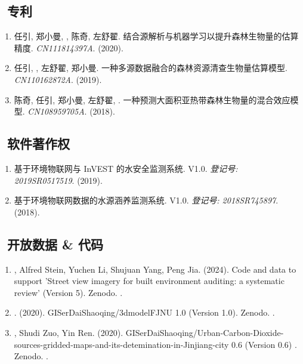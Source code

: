 \subsection*{\texorpdfstring{\faBook\ 专利}{专利}}
\begin{enumerate}
\item
     任引, 郑小曼, {}, 陈奇, 左舒翟.
     结合源解析与机器学习以提升森林生物量的估算精度.
     \textit{CN111814397A}. (2020).
\item
     任引, {}, 左舒翟, 郑小曼.
     一种多源数据融合的森林资源清查生物量估算模型.
     \textit{CN110162872A}. (2019).
\item
     陈奇, 任引, 郑小曼, 左舒翟, {}.
     一种预测大面积亚热带森林生物量的混合效应模型.
     \textit{CN108959705A}. (2018).
\end{enumerate}

\subsection*{\texorpdfstring{\faBook\ 软件著作权}{软件著作权}}
\begin{enumerate}
\item
   基于环境物联网与 InVEST 的水安全监测系统. V1.0.
    \textit{登记号: 2019SR0517519}. (2019).
\item
    基于环境物联网数据的水源涵养监测系统. V1.0.
    \textit{登记号: 2018SR745897}. (2018).
\end{enumerate}

\subsection*{\texorpdfstring{\faBook\ 开放数据 \& 代码}{开放数据 \& 代码}}
\begin{enumerate}
\item
   \Shaoqing, Alfred Stein, Yuchen Li, Shujuan Yang, Peng Jia. (2024).
    Code and data to support 'Street view imagery for built environment auditing: a systematic review'  (Version 5). Zenodo. 
    .
\item
   \Shaoqing. (2020).
    GISerDaiShaoqing/3dmodelFJNU 1.0 (Version 1.0). Zenodo. 
    .
\item
   \Shaoqing, Shudi Zuo, Yin Ren. (2020).
    GISerDaiShaoqing/Urban-Carbon-Dioxide-sources-gridded-maps-and-its-detemination-in-Jinjiang-city 0.6 (Version 0.6) . Zenodo. 
    .
\end{enumerate}
